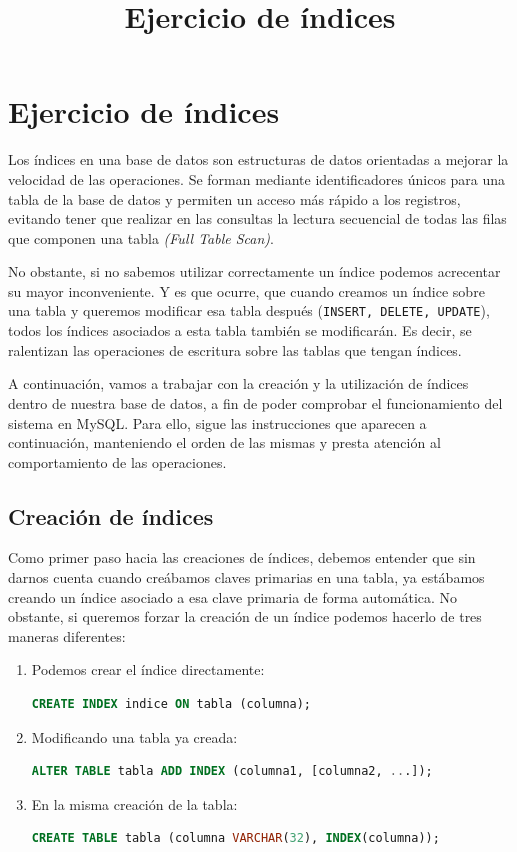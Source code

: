 \documentclass{db-practice}
\begin{document}
\title{Ejercicio de índices}

\section*{Ejercicio de índices}

Los índices en una base de datos son estructuras de datos orientadas a mejorar la velocidad de las operaciones. Se forman mediante identificadores únicos para una tabla de la base de datos y permiten un acceso más rápido a los registros, evitando tener que realizar en las consultas la lectura secuencial de todas las filas que componen una tabla \textit{(Full Table Scan)}. 

No obstante, si no sabemos utilizar correctamente un índice podemos acrecentar su mayor inconveniente. Y es que ocurre, que cuando creamos un índice sobre una tabla y queremos modificar esa tabla después (\texttt{INSERT, DELETE, UPDATE}), todos los índices asociados a esta tabla también se modificarán. Es decir, se ralentizan las operaciones de escritura sobre las tablas que tengan índices. 

A continuación, vamos a trabajar con la creación y la utilización de índices dentro de nuestra base de datos, a fin de poder comprobar el funcionamiento del sistema en MySQL. Para ello, sigue las instrucciones que aparecen a continuación, manteniendo el orden de las mismas y presta atención al comportamiento de las operaciones. 

\subsection*{Creación de índices}

Como primer paso hacia las creaciones de índices, debemos entender que sin darnos cuenta cuando creábamos claves primarias en una tabla, ya estábamos creando un índice asociado a esa clave primaria de forma automática. No obstante, si queremos forzar la creación de un índice podemos hacerlo de tres maneras diferentes: 

\begin{enumerate}
    \item Podemos crear el índice directamente: 
    \begin{lstlisting}[language=SQL]
CREATE INDEX indice ON tabla (columna); 
    \end{lstlisting}
        
    \item Modificando una tabla ya creada: 
    \begin{lstlisting}[language=SQL]
ALTER TABLE tabla ADD INDEX (columna1, [columna2, ...]); 
    \end{lstlisting} 

     \item En la misma creación de la tabla: 
     \begin{lstlisting}[language=SQL]
CREATE TABLE tabla (columna VARCHAR(32), INDEX(columna)); 
     \end{lstlisting} 
\end{enumerate}
\end{document}
